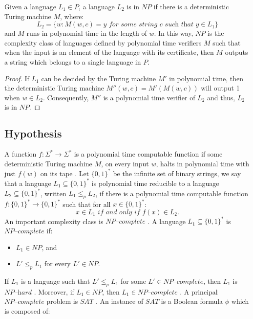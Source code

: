 \documentclass[a4paper,UKenglish,cleveref, autoref]{lipics-v2019}
\begin{document}
\begin{lemma}
\label{verifier}
Given a language $L_{1} \in P$, a language $L_{2}$ is in $NP$ if there is a deterministic Turing machine $M$, where:
\[L_{2} = \{w: M(w, c) = y \textit{ for some string } c \textit{ such that } y \in L_{1}\}\]
and $M$ runs in polynomial time in the length of $w$. In this way, $NP$ is the complexity class of languages defined by polynomial time verifiers $M$ such that when the input is an element of the language with its certificate, then $M$ outputs a string which belongs to a single language in $P$.
\end{lemma}

\begin{proof}
If $L_{1}$ can be decided by the Turing machine $M'$ in polynomial time, then the deterministic Turing machine $M''(w, c) = M'(M(w, c))$ will output 1 when $w \in L_{2}$. Consequently, $M''$ is a polynomial time verifier of $L_{2}$ and thus, $L_{2}$ is in $NP$.
\end{proof}

\subsection{Hypothesis}

A function $f : \Sigma^{*} \rightarrow \Sigma^{*}$ is a polynomial time computable function if some deterministic Turing machine $M$, on every input $w$, halts in polynomial time with just $f(w)$ on its tape \cite{MS06}. Let $\{0, 1\}^{*}$ be the infinite set of binary strings, we say that a language $L_{1} \subseteq \{0, 1\}^{*}$ is polynomial time reducible to a language $L_{2} \subseteq \{0, 1\}^{*}$, written $L_{1} \leq_{p} L_{2}$, if there is a polynomial time computable function $f : \{0, 1\}^{*} \rightarrow \{0, 1\}^{*}$ such that for all $x \in \{0, 1\}^{*}$:
\[x \in L_{1} \textit{ if and only if } f(x) \in L_{2}.\]
An important complexity class is $\textit{NP--complete}$ \cite{GJ79}. A language $L_{1} \subseteq \{0, 1\}^{*}$ is $\textit{NP--complete}$ if:

\begin{itemize}
\item $L_{1} \in NP$, and
\item $L' \leq_{p} L_{1}$ for every $L' \in NP$.
\end{itemize}

If $L_{1}$ is a language such that $L' \leq_{p} L_{1}$ for some $L' \in \textit{NP--complete}$, then $L_{1}$ is $\textit{NP--hard}$ \cite{CLRS01}. Moreover, if $L_{1} \in NP$, then $L_{1} \in \textit{NP--complete}$ \cite{CLRS01}. A principal $\textit{NP--complete}$ problem is $SAT$ \cite{GJ79}. An instance of $SAT$ is a Boolean formula $\phi$ which is composed of:
\end{document}
